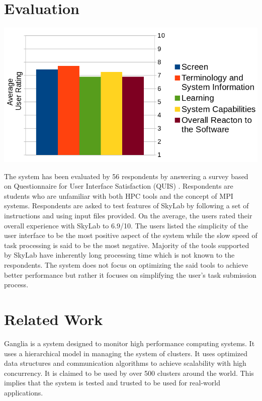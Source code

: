 \section{Evaluation}
	\begin{center}			
			\includegraphics[scale=0.32]{./images/uat_graph.png}			
	\end{center}
	The system has been evaluated by 56 respondents by answering a survey based on Questionnaire for User Interface Satisfaction (QUIS) \cite{chin1988development}. Respondents are students who are unfamiliar with both HPC tools and the concept of MPI systems.  Respondents are asked to test features of SkyLab by following a set of instructions and using input files provided. On the average, the users rated their overall experience with SkyLab to 6.9/10. The users listed the simplicity of the user interface to be the most positive aspect of the system while the slow speed of task processing is said to be the most negative. Majority of the tools supported by SkyLab have inherently long processing time which is not known to the respondents. The system does not focus on optimizing the said tools to achieve better performance but rather it focuses on simplifying the user's task submission process. 

\section{Related Work}
Ganglia is a system designed to monitor high performance computing systems. It uses a hierarchical model in managing the system of clusters. It uses optimized data structures and communication algorithms to achieve scalability with high concurrency. It is claimed to be used by over 500 clusters around the world. This implies that the system is tested and trusted to be used for real-world applications\cite{1395654820040701}.
	    
